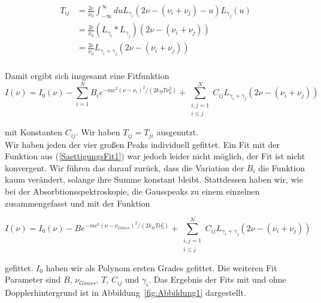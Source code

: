 \documentclass[a4paper,parskip]{scrartcl}
\begin{document}
\begin{align*}
T_{ij} &= \frac{2c}{\nu_0}\int_{-\infty}^\infty du L_{\gamma_i}(2\nu-(\nu_i+\nu_j)-u)L_{\gamma_j}(u)\\
&= \frac{2c}{\nu_0} (L_{\gamma_i} * L_{\gamma_j})(2\nu-(\nu_i+\nu_j)) \\
&= \frac{2c}{\nu_0} L_{\gamma_i+\gamma_j}(2\nu-(\nu_i+\nu_j)) \\
\end{align*}

Damit ergibt sich insgesamt eine Fitfunktion
\begin{equation}
I(\nu) = I_0(\nu)-\sum_{i=1}^N B_i e^{-mc^2(\nu-\nu_i)^2/(2k_BT\nu_0^2)} +\sum_{\substack{i,j=1\\i\leq j}}^N C_{ij} L_{\gamma_i+\gamma_j}(2\nu-(\nu_i+\nu_j))
\label{SaettigungsFit1}
\end{equation}


mit Konstanten $C_{ij}$. Wir haben $T_{ij}=T_{ji}$ ausgenutzt.\\

Wir haben jeden der vier großen Peaks individuell gefittet. Ein Fit mit der Funktion aus (\ref{SaettigungsFit1}) war jedoch leider nicht möglich, der Fit ist nicht konvergent. Wir führen das darauf zurück, dass die Variation der $B_i$ die Funktion kaum verändert, solange ihre Summe konstant bleibt. Stattdessen haben wir, wie bei der Absorbtionsspektroskopie, die Gausspeaks zu einem einzelnen zusammengefasst und mit der Funktion

 \begin{equation}
I(\nu) = I_0(\nu)-B e^{-mc^2(\nu-\nu_{Gauss})^2/(2k_BT\nu_0^2)} +\sum_{\substack{i,j=1\\i\leq j}}^N C_{ij} L_{\gamma_i+\gamma_j}(2\nu-(\nu_i+\nu_j))
\label{SaettigungsFit2}
\end{equation}

gefittet. $I_0$ haben wir als Polynom ersten Grades gefittet. Die weiteren Fit Parameter sind $B$, $\nu_{Gauss}$, $T$, $C_{ij}$ und $\gamma_i$. Das Ergebnis der Fits mit und ohne Dopplerhintergrund ist in Abbildung~\ref{fig:Abbildung1} dargestellt.
\end{document}
